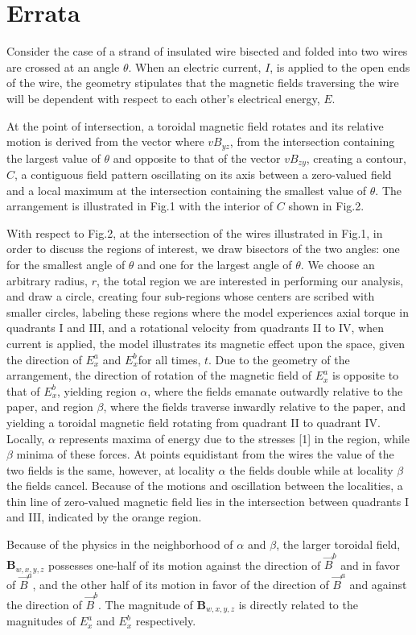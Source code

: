 \documentclass[]{article}
\begin{document}
\section{Errata}
Consider the case of a strand of insulated wire bisected and folded into two wires are crossed at an angle $\theta$. When an electric current, $I$, is applied to the open ends of the wire, the geometry stipulates that the magnetic fields traversing the wire will be dependent with respect to each other's electrical energy, $E$.

At the point of intersection, a toroidal magnetic field rotates and its relative motion is derived from the vector where $v{{B}_{yz}}$, from the intersection containing the largest value of $\theta$ and opposite to that of the vector $v{{B}_{zy}}$, creating a contour, $C$, a contiguous field pattern oscillating on its axis between a zero-valued field and a local maximum at the intersection containing the smallest value of $\theta$. The arrangement is illustrated in Fig.1 with the interior of $C$ shown in Fig.2.

With respect to Fig.2, at the intersection of the wires illustrated in Fig.1, in order to discuss the regions of interest, we draw bisectors of the two angles: one for the smallest angle of $\theta$ and one for the largest angle of $\theta$. We choose an arbitrary radius, $r$, the total region we are interested in performing our analysis, and draw a circle, creating four sub-regions whose centers are scribed with smaller circles, labeling these regions where the model experiences axial torque in quadrants I and III, and a rotational velocity from quadrants II to IV, when current is applied, the model illustrates its magnetic effect upon the space, given the direction of $E_{x}^{a}$ and $E_{x}^{b}$for all times, $t$. Due to the geometry of the arrangement, the direction of rotation of the magnetic field of $E_{x}^{a}$ is opposite to that of $E_{x}^{b}$, yielding region $\alpha$, where the fields emanate outwardly relative to the paper, and region $\beta$, where the fields traverse inwardly relative to the paper, and yielding a toroidal magnetic field rotating from quadrant II to quadrant IV. Locally, $\alpha$ represents maxima of energy due to the stresses [1] in the region, while $\beta$ minima of these forces. At points equidistant from the wires the value of the two fields is the same, however, at locality $\alpha$ the fields double while at locality $\beta$ the fields cancel. Because of the motions and oscillation between the localities, a thin line of zero-valued magnetic field lies in the intersection between quadrants I and III, indicated by the orange region.

Because of the physics in the neighborhood of $\alpha$ and $\beta$, the larger toroidal field, ${{\mathbf{B}}_{w,x,y,z}}$ possesses one-half of its motion against the direction of ${{\vec{B}}^{b}}$ and in favor of ${{\vec{B}}^{a}}$, and the other half of its motion in favor of the direction of ${{\vec{B}}^{a}}$ and against the direction of ${{\vec{B}}^{b}}$. The magnitude of ${{\mathbf{B}}_{w,x,y,z}}$ is directly related to the magnitudes of $E_{x}^{a}$ and $E_{x}^{b}$ respectively.
\end{document}
